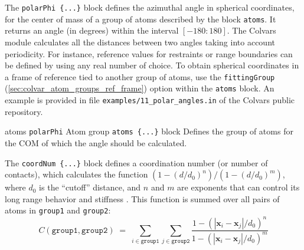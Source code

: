 
The \texttt{polarPhi~\{...\}} block defines the azimuthal angle in
spherical coordinates, for the center of mass of a group of atoms
described by the block \texttt{atoms}. It returns an angle
(in degrees) within the interval $[-180:180]$.  The Colvars module
calculates all the distances between two angles taking into account
periodicity.  For instance, reference values for restraints or range
boundaries can be defined by using any real number of choice.
To obtain spherical coordinates in a frame of reference tied to
another group of atoms, use the \texttt{fittingGroup} (\ref{sec:colvar_atom_groups_ref_frame}) option
within the \texttt{atoms} block.
An example is provided in file \texttt{examples/11\_polar\_angles.in} of the Colvars public repository.


\begin{cvcoptions}
\item %
  \key
    {atoms}{%
    \texttt{polarPhi}}{%
    Atom group}{%
    \texttt{atoms~\{...\}} block}{%
    Defines the group of atoms for the COM of which the angle should be calculated.
    }
\end{cvcoptions}





The \texttt{coordNum \{...\}} block defines
a coordination number (or number of contacts), which calculates the
function $(1-(d/d_0)^{n})/(1-(d/d_0)^{m})$, where $d_0$ is the
``cutoff'' distance, and $n$ and $m$ are exponents that can control
its long range behavior and stiffness \cite{Iannuzzi2003}.  This
function is summed over all pairs of atoms in \texttt{group1} and
\texttt{group2}:
\begin{equation}
  \label{eq:cvc_coordNum}
  C (\mathtt{group1}, \mathtt{group2}) \; = \;
  \sum_{i\in\mathtt{group1}}\sum_{j\in\mathtt{group2}} {
    \frac{1 - (|\mathbf{x}_{i}-\mathbf{x}_{j}|/d_{0})^{n}}{
      1 - (|\mathbf{x}_{i}-\mathbf{x}_{j}|/d_{0})^{m} }
  }
\end{equation}

